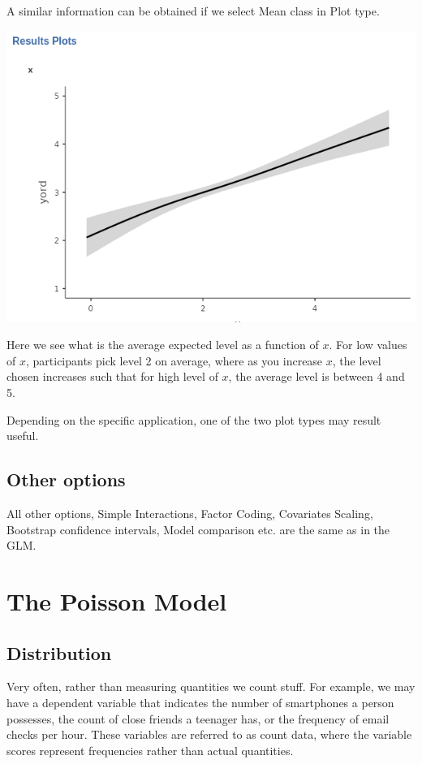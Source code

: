 \documentclass[
]{book}
\begin{document}
A similar information can be obtained if we select {Mean class} in {Plot type}.

\includegraphics{bookletpics/3_ordinal_plot2.png}

Here we see what is the average expected level as a function of \(x\). For low values of \(x\), participants pick level 2 on average, where as you increase \(x\), the level chosen increases such that for high level of \(x\), the average level is between 4 and 5.

Depending on the specific application, one of the two plot types may result useful.

\hypertarget{other-options-2}{%
\subsection{Other options}\label{other-options-2}}

All other options, {Simple Interactions}, {Factor Coding}, {Covariates Scaling}, {Bootstrap} confidence intervals, {Model comparison} etc. are the same as in the GLM.

\hypertarget{poisson}{%
\section{The Poisson Model}\label{poisson}}

\hypertarget{distribution}{%
\subsection{Distribution}\label{distribution}}

Very often, rather than measuring quantities we count stuff. For example, we may have a dependent variable that indicates the number of smartphones a person possesses, the count of close friends a teenager has, or the frequency of email checks per hour. These variables are referred to as count data, where the variable scores represent frequencies rather than actual quantities.
\end{document}
